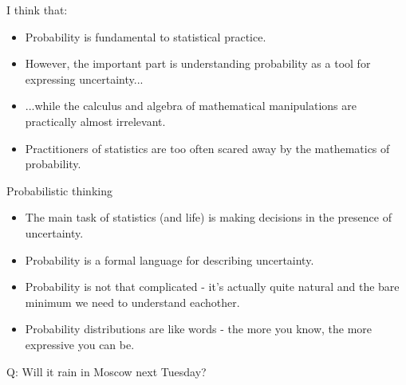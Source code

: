 \begin{frame}{I think that:}

\begin{Large}
\begin{itemize}
\item Probability is fundamental to statistical practice.
\item However, the important part is understanding probability as a tool for expressing uncertainty...
\item ...while the calculus and algebra of mathematical manipulations are practically almost irrelevant.
\item Practitioners of statistics are too often scared away by the mathematics of probability.
\end{itemize}
\end{Large}
\end{frame}


\begin{frame}{Probabilistic thinking}

\bigskip

\begin{itemize}\itemsep1.2em

\item The main task of statistics (and life) is making decisions in the presence of uncertainty.

\item Probability is a formal language for describing uncertainty.

\item Probability is not that complicated - it's actually quite natural and the bare minimum we need to understand eachother.

\item Probability distributions are like words - the more you know, the more expressive you can be.

\end{itemize}

\bigskip

\end{frame}


\begin{frame}{}
\centering

\bigskip

\bigskip

\smallskip

\begin{LARGE}
{\color{red} Q:} Will it rain in Moscow next Tuesday?
\end{LARGE}

\end{frame}


